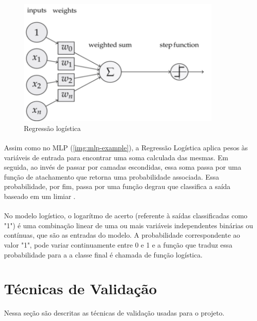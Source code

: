 \documentclass[grad,numbers]{coppe}
\begin{document}
                \begin{figure}[h]
                    \caption{Regressão logística}
                    \label{img:logreg-example}
                    \includegraphics[width=10cm]{logreg-example.png}
                    \centering
                \end{figure}
                
                \paragraph{}Assim como no MLP (\ref{img:mlp-example}), a Regressão Logística aplica pesos às variáveis de entrada para encontrar uma soma calculada das mesmas. Em seguida, ao invés de passar por camadas escondidas, essa soma passa por uma função de atachamento que retorna uma probabilidade associada. Essa probabilidade, por fim, passa por uma função degrau que classifica a saída baseado em um limiar \cite{logreg-model}.
                
                \paragraph{}No modelo logístico, o logarítmo de acerto (referente à saídas classificadas como "1") é uma combinação linear de uma ou mais variáveis independentes binárias ou contínuas, que são as entradas do modelo. A probabilidade correspondente ao valor "1", pode variar continuamente entre 0 e 1 e a função que traduz essa probabilidade para a a classe final é chamada de função logística.
                
        \section{Técnicas de Validação}\label{sec:validation}
        
            \paragraph{}Nessa seção são descritas as técnicas de validação usadas para o projeto.
            
\end{document}
